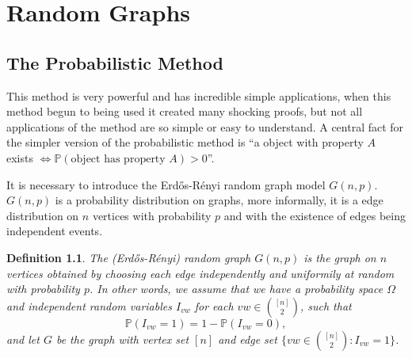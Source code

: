 \documentclass[12pt,twoside,a4paper]{book}
\numberwithin{equation}{section}
\newtheorem{theorem}             {Theorem}[section]
\newtheorem{definition}	[theorem] {Definition}
\theoremstyle{remark}
\begin{document}







\chapter{Random Graphs}
\section{The Probabilistic Method}
This method is very powerful and has incredible simple applications, when this method begun to being used it created many shocking proofs, but not all applications of the method are so simple or easy to understand. A central fact for the simpler version of the probabilistic method is ``a object with property $ A$ exists $\iff  \mathbb{P}(\text{object has property }A)>0$''.

It is necessary to introduce the Erd\H{o}s-Rényi random graph model $G(n,p)$. $G(n,p)$ is a probability distribution on graphs, more informally, it is a edge distribution on $n$ vertices with probability $p$ and with the existence of edges being independent events.

\begin{definition}\label{def:randomgraph}
The (Erd\H{o}s-Rényi) random graph $G(n,p)$ is the graph on $n$ vertices obtained by choosing each edge independently and uniformily at random with probability $p$. In other words, we assume that we have a probability space $\Omega$ and independent random variables $I_{vw}$ for each $vw \in \binom{[n]}{2}$, such that
$$\mathbb{P}(I_{vw} = 1) = 1 - \mathbb{P}(I_{vw} = 0),$$ 
and let $G$ be the graph with vertex set $[n]$ and edge set $\{vw \in \binom{[n]}{2}: I_{vw} = 1\}$. 

\end{definition}
\end{document}
